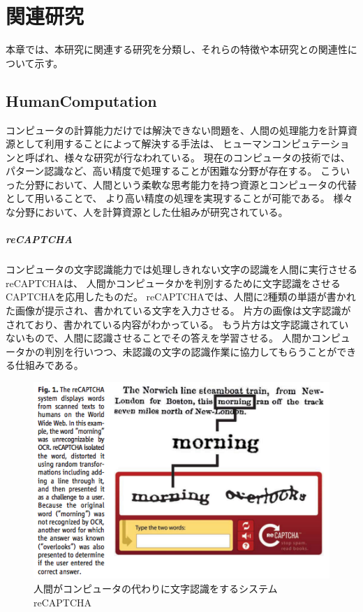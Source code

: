 \chapter{関連研究}\label{chap:related}

本章では、本研究に関連する研究を分類し、それらの特徴や本研究との関連性について示す。

\section{HumanComputation}\label{humancomputation}

コンピュータの計算能力だけでは解決できない問題を、人間の処理能力を計算資源として利用することによって解決する手法は、
ヒューマンコンピュテーション\cite{humancomputation}と呼ばれ、様々な研究が行なわれている。
現在のコンピュータの技術では、パターン認識など、高い精度で処理することが困難な分野が存在する。
こういった分野において、人間という柔軟な思考能力を持つ資源とコンピュータの代替として用いることで、
より高い精度の処理を実現することが可能である。
様々な分野において、人を計算資源とした仕組みが研究されている。

\paragraph{reCAPTCHA}\label{recaptcha}

\mbox{}

コンピュータの文字認識能力では処理しきれない文字の認識を人間に実行させるreCAPTCHA\cite{recaptcha}は、
人間かコンピュータかを判別するために文字認識をさせるCAPTCHA\cite{captcha}を応用したものだ。
reCAPTCHAでは、人間に2種類の単語が書かれた画像が提示され、書かれている文字を入力させる。
片方の画像は文字認識がされており、書かれている内容がわかっている。
もう片方は文字認識されていないもので、人間に認識させることでその答えを学習させる。
人間かコンピュータかの判別を行いつつ、未認識の文字の認識作業に協力してもらうことができる仕組みである。

\begin{figure}[htbp]
  \begin{center}
  \includegraphics[width=.5\linewidth,bb=0 0 476 316]{images/recaptcha.png}
  \end{center}
  \caption{人間がコンピュータの代わりに文字認識をするシステム reCAPTCHA}
  \label{fig:recaptcha}
\end{figure}

